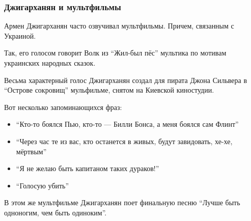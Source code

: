  
 
 

\subsubsection{Джигарханян и мультфильмы}

Армен Джигарханян часто озвучивал мультфильмы. Причем, связанным с
Украиной.

Так, его голосом говорит Волк из \enquote{Жил-был пёс} \dshM мультика по мотивам
украинских народных сказок. 

Весьма характерный голос Джигарханян создал для пирата Джона Сильвера в
\enquote{Острове сокровищ} \dshM мульфильме, снятом на Киевской киностудии. 

Вот несколько запоминающихся фраз:

\begin{itemize}
  \item \enquote{Кто-то боялся Пью, кто-то — Билли Бонса, а меня боялся сам Флинт}
  \item \enquote{Через час те из вас, кто останется в живых, будут завидовать, хе-хе, мёртвым}
  \item \enquote{Я не желаю быть капитаном таких дураков!}
  \item \enquote{Голосую \dshM убить}
\end{itemize}

В этом же мультфильме Джигарханян поет финальную песню \dshM \enquote{Лучше быть
одноногим, чем быть одиноким}.

